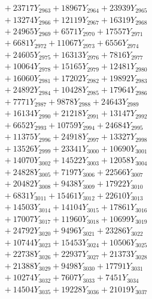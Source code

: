 \documentclass[a4paper,10pt]{article}
\begin{document}
{\begin{align}
&\;  + 23717 Y_{2963} + 18967 Y_{2964} + 23939 Y_{2965} \\[0.3ex]
&\;  + 13274 Y_{2966} + 12119 Y_{2967} + 16319 Y_{2968} \\[0.5ex]\allowbreak
&\;  + 24965 Y_{2969} + 6571 Y_{2970} + 17557 Y_{2971} \\[0.3ex]
&\;  + 6681 Y_{2972} + 11067 Y_{2973} + 6556 Y_{2974} \\[0.3ex]
&\;  + 24605 Y_{2975} + 16313 Y_{2976} + 7816 Y_{2977} \\[0.3ex]
&\;  + 10064 Y_{2978} + 15165 Y_{2979} + 12481 Y_{2980} \\[0.3ex]
&\;  + 16060 Y_{2981} + 17202 Y_{2982} + 19892 Y_{2983} \\[0.3ex]
&\;  + 24892 Y_{2984} + 10428 Y_{2985} + 17964 Y_{2986} \\[0.3ex]
&\;  + 7771 Y_{2987} + 9878 Y_{2988} + 24643 Y_{2989} \\[0.3ex]
&\;  + 16134 Y_{2990} + 21218 Y_{2991} + 13147 Y_{2992} \\[0.3ex]
&\;  + 6652 Y_{2993} + 10759 Y_{2994} + 24684 Y_{2995} \\[0.3ex]
&\;  + 11375 Y_{2996} + 24918 Y_{2997} + 13327 Y_{2998} \\[0.5ex]\allowbreak
&\;  + 13526 Y_{2999} + 23341 Y_{3000} + 10690 Y_{3001} \\[0.3ex]
&\;  + 14070 Y_{3002} + 14522 Y_{3003} + 12058 Y_{3004} \\[0.3ex]
&\;  + 24828 Y_{3005} + 7197 Y_{3006} + 22566 Y_{3007} \\[0.3ex]
&\;  + 20482 Y_{3008} + 9438 Y_{3009} + 17922 Y_{3010} \\[0.3ex]
&\;  + 6831 Y_{3011} + 15461 Y_{3012} + 22610 Y_{3013} \\[0.3ex]
&\;  + 14503 Y_{3014} + 14104 Y_{3015} + 17861 Y_{3016} \\[0.3ex]
&\;  + 17007 Y_{3017} + 11960 Y_{3018} + 10699 Y_{3019} \\[0.3ex]
&\;  + 24792 Y_{3020} + 9496 Y_{3021} + 23286 Y_{3022} \\[0.3ex]
&\;  + 10744 Y_{3023} + 15453 Y_{3024} + 10506 Y_{3025} \\[0.3ex]
&\;  + 22738 Y_{3026} + 22937 Y_{3027} + 21373 Y_{3028} \\[0.5ex]\allowbreak
&\;  + 21388 Y_{3029} + 9498 Y_{3030} + 17791 Y_{3031} \\[0.3ex]
&\;  + 10274 Y_{3032} + 7607 Y_{3033} + 7451 Y_{3034} \\[0.3ex]
&\;  + 14504 Y_{3035} + 19228 Y_{3036} + 21019 Y_{3037} \\[0.3ex]

\end{align}}
\end{document}

